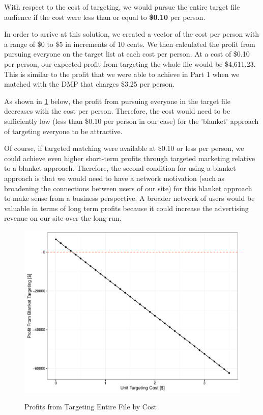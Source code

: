 With respect to the cost of targeting, we would pursue the entire target file audience if the cost were less than or equal to \textbf{\$0.10} per person.

In order to arrive at this solution, we created a vector of the cost per person with a range of \$0 to \$5 in increments of 10 cents. We then calculated the profit from pursuing everyone on the target list at each cost per person. At a cost of \$0.10 per person, our expected profit from targeting the whole file would be \$4,611.23. This is similar to the profit that we were able to achieve in Part 1 when we matched with the DMP that charges \$3.25 per person.

As shown in \cref{fig:Profit_Grid} below, the profit from pursuing everyone in the target file decreases with the cost per person. Therefore, the cost would need to be sufficiently low (less than \$0.10 per person in our case) for the 'blanket' approach of targeting everyone to be attractive. 

Of course, if targeted matching were available at \$0.10 or less per person, we could achieve even higher short-term profits through targeted marketing relative to a blanket approach. Therefore, the second condition for using a blanket approach is that we would need to have a network motivation (such as broadening the connections between users of our site) for this blanket approach to make sense from a business perspective. A broader network of users would be valuable in terms of long term profits because it could increase the advertising revenue on our site over the long run.

\begin{figure}[!htb]
  \centering
  \caption{Profits from Targeting Entire File by Cost}
  \includegraphics[scale=.5]{Profit_Grid2.pdf}
  \label{fig:Profit_Grid}
\end{figure}

